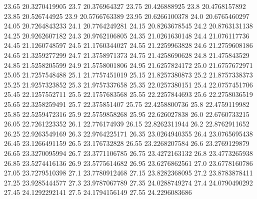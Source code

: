           23.65    20.3270419905
           23.7     20.376964327
          23.75     20.426888925
           23.8    20.4768157892
          23.85     20.526744925
           23.9    20.5766763389
          23.95    20.6266100378
           24.0    20.6765460297
          24.05    20.7264843233
           24.1    20.7764249281
          24.15    20.8263678545
           24.2    20.8763131138
          24.25    20.9262607182
           24.3    20.9762106805
          24.35    21.0261630148
           24.4     21.076117736
          24.45    21.1260748597
           24.5    21.1760344027
          24.55    21.2259963828
           24.6    21.2759608186
          24.65    21.3259277299
           24.7    21.3758971373
          24.75    21.4258690628
           24.8     21.475843529
          24.85    21.5258205599
           24.9    21.5758001806
          24.95    21.6257824172
           25.0    21.6757672971
          25.05    21.7257548488
           25.1    21.7757451019
          25.15    21.8257380873
           25.2    21.8757338373
          25.25    21.9257323852
           25.3    21.9757337658
          25.35    22.0257380151
           25.4    22.0757451706
          25.45    22.1257552711
           25.5    22.1757683568
          25.55    22.2257844693
           25.6    22.2758036519
          25.65    22.3258259491
           25.7     22.375851407
          25.75    22.4258800736
           25.8    22.4759119982
          25.85    22.5259472316
           25.9    22.5759858268
          25.95     22.626027838
           26.0    22.6760733215
          26.05    22.7261223352
           26.1     22.776174939
          26.15    22.8262311944
           26.2    22.8762911652
          26.25    22.9263549169
           26.3    22.9764225171
          26.35    23.0264940355
           26.4    23.0765695438
          26.45    23.1266491159
           26.5     23.176732828
          26.55    23.2268207584
           26.6    23.2769129879
          26.65    23.3270095994
           26.7    23.3771106785
          26.75    23.4272163132
           26.8    23.4773265938
          26.85    23.5274416136
           26.9    23.5775614682
          26.95    23.6276862561
           27.0    23.6778160786
          27.05    23.7279510398
           27.1    23.7780912468
          27.15    23.8282368095
           27.2    23.8783878411
          27.25    23.9285444577
           27.3    23.9787067789
          27.35    24.0288749274
           27.4    24.0790490292
          27.45    24.1292292141
           27.5    24.1794156149
          27.55    24.2296083686

